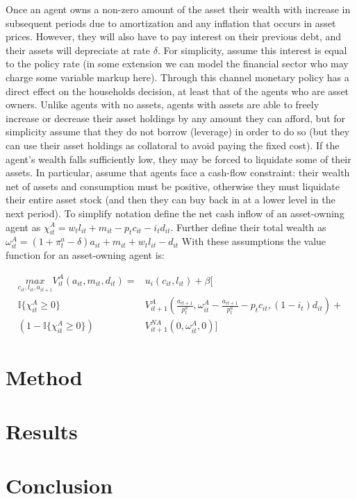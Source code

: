 \documentclass{article}
\begin{document}
Once an agent owns a non-zero amount of the asset their wealth with increase in subsequent periods due to amortization and any inflation that occurs in asset prices. However, they will also have to pay interest on their previous debt, and their assets will depreciate at rate $\delta$. For simplicity, assume this interest is equal to the policy rate (in some extension we can model the financial sector who may charge some variable markup here). Through this channel monetary policy has a direct effect on the households decision, at least that of the agents who are asset owners. Unlike agents with no assets, agents with assets are able to freely increase or decrease their asset holdings by any amount they can afford, but for simplicity assume that they do not borrow (leverage) in order to do so (but they can use their asset holdings as collatoral to avoid paying the fixed cost). If the agent's wealth falls sufficiently low, they may be forced to liquidate some of their assets. In particular, assume that agents face a cash-flow constraint: their wealth net of assets and consumption must be positive, otherwise they must liquidate their entire asset stock (and then they can buy back in at a lower level in the next period). To simplify notation define the net cash inflow of an asset-owning agent as $\chi^A_{it} = w_t l_{it} + m_{it} - p_t c_{it} - i_t d_{it}$. Further define their total wealth as $\omega^A_{it} = \left( 1 + \pi^a_t - \delta \right) a_{it} + m_{it} + w_t l_{it} - d_{it}$ With these assumptions the value function for an asset-owning agent is:

\begin{align}
  \underset{c_{it}, l_{it}, a_{it+1}}{max} V^{A}_{it}(a_{it}, m_{it}, d_{it}) = &u_{i}(c_{it}, l_{it}) + \beta [  \nonumber \\ 
  \mathbb{I}\{ \chi^A_{it} \geq 0 \} &V^A_{it+1}(\frac{a_{it+1}}{p^a_t}, \omega^A_{it} - \frac{a_{it+1}}{p^a_t} - p_t c_{it}, (1-i_t) d_{it}) + \nonumber \\ 
  \left(1 - \mathbb{I}\{ \chi^A_{it} \geq 0 \} \right) &V^{NA}_{it+1}(0, \omega^A_{it}, 0)] \label{va}
\end{align}

\section{Method} \label{method}

\section{Results} \label{results}

\section{Conclusion} \label{conclusion}


\newpage
\printbibliography
\end{document}
